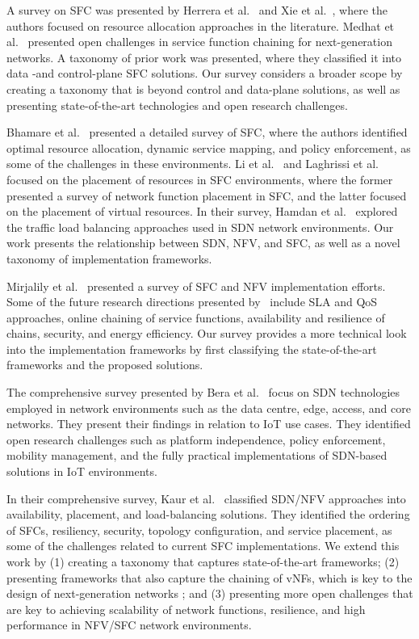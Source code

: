 \documentclass[futureinternet,review,accept,pdftex,moreauthors]{Definitions/mdpi}
\begin{document}
A survey on SFC was presented by Herrera {et al.}~\cite{herrera2016resource} and Xie {et al.}~\cite{xie2016service}, where the authors focused on resource allocation approaches in the literature. Medhat {et al.}~\cite{medhat2016service} presented open challenges in service function chaining for next-generation networks. A taxonomy of prior work was presented, where they classified it into data -and control-plane SFC solutions. Our survey considers a broader scope by creating a taxonomy that is beyond control and data-plane solutions, as well as presenting state-of-the-art technologies and open research challenges.

Bhamare {et al.}~\cite{bhamare2016survey} presented a detailed survey of SFC, where the authors identified optimal resource allocation, dynamic service mapping, and policy enforcement, as some of the challenges in these environments. Li {et al.}~\cite{li2016survey} and Laghrissi {et al.}~\cite{laghrissi2018survey} focused on the placement of resources in SFC environments, where the former presented a survey of network function placement in SFC, and the latter focused on the placement of virtual resources. In their survey, Hamdan {et al.}~\cite{hamdan2021comprehensive} explored the traffic load balancing approaches used in SDN network environments. Our work presents the relationship between SDN, NFV, and SFC, as well as a novel taxonomy of implementation frameworks.

Mirjalily {et al.}~\cite{mirjalily2018optimal} presented a survey of SFC and NFV implementation efforts. Some of the future research directions presented by~\cite{mirjalily2018optimal} include SLA and QoS approaches, online chaining of service functions, availability and resilience of chains, security, and energy efficiency. Our survey provides a more technical look into the implementation frameworks by first classifying the state-of-the-art frameworks and the proposed solutions.

The comprehensive survey presented by Bera {et al.}~\cite{bera2017software} focus on SDN technologies employed in network environments such as the data centre, edge, access, and core networks. They present their findings in relation to IoT use cases. They identified open research challenges such as platform independence, policy enforcement, mobility management, and the fully practical implementations of SDN-based solutions in IoT environments. 

In their comprehensive survey, Kaur {et al.}~\cite{kaur2020comprehensive} classified SDN/NFV approaches into availability, placement, and load-balancing solutions. They identified the ordering of SFCs, resiliency, security, topology configuration, and service placement, as some of the challenges related to current SFC implementations. We extend this work by (1) creating a taxonomy that captures state-of-the-art frameworks; (2) presenting frameworks that also capture the chaining of vNFs, which is key to the design of next-generation networks ; and (3) presenting more open challenges that are key to achieving scalability of network functions, resilience, and high performance in NFV/SFC network environments.
\end{document}
